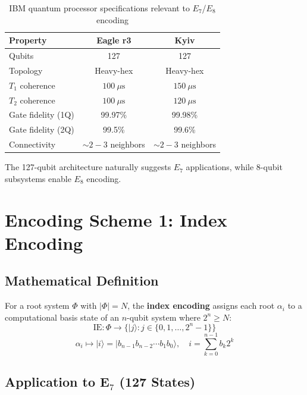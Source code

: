 \begin{table}[h]
\centering
\begin{tabular}{lcc}
\toprule
\textbf{Property} & \textbf{Eagle r3} & \textbf{Kyiv} \\
\midrule
Qubits & 127 & 127 \\
Topology & Heavy-hex & Heavy-hex \\
$T_1$ coherence & $100~\mu\text{s}$ & $150~\mu\text{s}$ \\
$T_2$ coherence & $100~\mu\text{s}$ & $120~\mu\text{s}$ \\
Gate fidelity (1Q) & 99.97\% & 99.98\% \\
Gate fidelity (2Q) & 99.5\% & 99.6\% \\
Connectivity & $\sim 2-3$ neighbors & $\sim 2-3$ neighbors \\
\bottomrule
\end{tabular}
\caption{IBM quantum processor specifications relevant to $E_7$/$ E_8$ encoding}
\label{tab:ibm_processors}
\end{table}

The 127-qubit architecture naturally suggests $E_7$ applications, while 8-qubit subsystems enable $E_8$ encoding.

\section{Encoding Scheme 1: Index Encoding}

\subsection{Mathematical Definition}

\begin{definition}
\label{def:index_encoding}
For a root system $\Phi$ with $|\Phi| = N$, the \textbf{index encoding} assigns each root $\alpha_i$ to a computational basis state of an $n$-qubit system where $2^n \ge N$:
\begin{equation}
\text{IE}: \Phi \to \{|j\rangle : j \in \{0, 1, \ldots, 2^n - 1\}\}
\end{equation}
\begin{equation}
\alpha_i \mapsto |i\rangle = |b_{n-1} b_{n-2} \cdots b_1 b_0\rangle, \quad i = \sum_{k=0}^{n-1} b_k 2^k
\end{equation}
\end{definition}

\subsection{Application to E$_7$ (127 States)}

